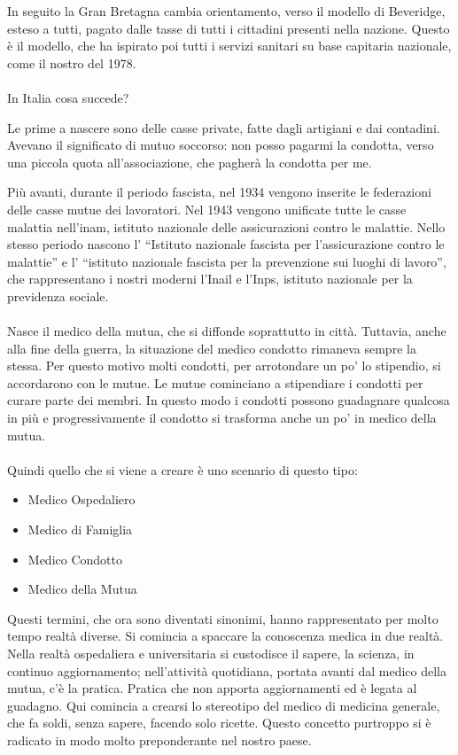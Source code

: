 In seguito la Gran Bretagna cambia orientamento, verso il modello di
Beveridge, esteso a tutti, pagato dalle tasse di tutti i cittadini
presenti nella nazione. Questo è il modello, che ha ispirato poi tutti i
servizi sanitari su base capitaria nazionale, come il nostro del 1978.
\\\\
In Italia cosa succede?

Le prime a nascere sono delle casse private, fatte dagli artigiani e dai
contadini. Avevano il significato di mutuo soccorso: non posso pagarmi
la condotta, verso una piccola quota all'associazione, che pagherà la
condotta per me.

Più avanti, durante il periodo fascista, nel 1934 vengono inserite le
federazioni delle casse mutue dei lavoratori. Nel 1943 vengono unificate
tutte le casse malattia nell'inam, istituto nazionale delle
assicurazioni contro le malattie. Nello stesso periodo nascono l'
``Istituto nazionale fascista per l'assicurazione contro le malattie'' e
l' ``istituto nazionale fascista per la prevenzione sui luoghi di
lavoro'', che rappresentano i nostri moderni l'Inail e l'Inps, istituto
nazionale per la previdenza sociale.
\\\\
Nasce il medico della mutua, che si diffonde soprattutto in città.
Tuttavia, anche alla fine della guerra, la situazione del medico
condotto rimaneva sempre la stessa. Per questo motivo molti condotti,
per arrotondare un po' lo stipendio, si accordarono con le mutue. Le
mutue cominciano a stipendiare i condotti per curare parte dei membri.
In questo modo i condotti possono guadagnare qualcosa in più e
progressivamente il condotto si trasforma anche un po' in medico della
mutua.
\\\\
Quindi quello che si viene a creare è uno scenario di questo tipo:

\begin{itemize}
\item
  Medico Ospedaliero
\item
  Medico di Famiglia
\item
  Medico Condotto
\item
  Medico della Mutua
\end{itemize}

Questi termini, che ora sono diventati sinonimi, hanno rappresentato per
molto tempo realtà diverse. Si comincia a spaccare la conoscenza medica
in due realtà. Nella realtà ospedaliera e universitaria si custodisce il
sapere, la scienza, in continuo aggiornamento; nell'attività quotidiana,
portata avanti dal medico della mutua, c'è la pratica. Pratica che non
apporta aggiornamenti ed è legata al guadagno. Qui comincia a crearsi lo
stereotipo del medico di medicina generale, che fa soldi, senza sapere,
facendo solo ricette. Questo concetto purtroppo si è radicato in modo
molto preponderante nel nostro paese.

